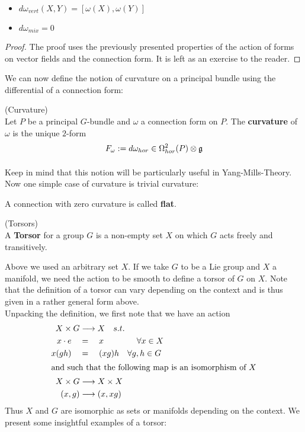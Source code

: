 \begin{prop}~
\begin{itemize}
  \item $d\omega_{vert}(X,Y) = [\omega(X), \omega(Y)]$
  \item $d\omega_{mix} = 0$
\end{itemize}
\begin{proof}
  The proof uses the previously presented properties of the action of forms on vector fields and the connection form. It is left as an exercise to the reader.
\end{proof}
\end{prop}

We can now define the notion of curvature on a principal bundle using the differential of a connection form:

\begin{definition}(Curvature)\\
  Let $P$ be a principal $G$-bundle and $\omega$ a connection form on $P$. The \textbf{curvature} of $\omega$ is the unique $2$-form
  $$ F_\omega := d\omega_{hor} \in \Omega^2_{hor}(P) \mathbin{\mathop{\otimes}\displaylimits_{}} \mathfrak{g} $$
\end{definition}

Keep in mind that this notion will be particularly useful in Yang-Mills-Theory. Now one simple case of curvature is trivial curvature:

\begin{definition}
  A connection with zero curvature is called \textbf{flat}.
\end{definition}


\begin{definition} (Torsors)\\
  A \textbf{Torsor} for a group $G$ is a non-empty set $X$ on which $G$ acts freely and transitively.
\end{definition}

Above we used an arbitrary set $X$. If we take $G$ to be a Lie group and $X$ a manifold, we need the action to be smooth to define a torsor of $G$ on $X$. Note that the definition of a torsor can vary depending on the context and is thus given in a rather general form above.\\

Unpacking the definition, we first note that we have an action
\begin{align}
  X \times G & \longrightarrow X \quad s.t.\\
  x \cdot e \quad &= \quad x \quad \quad \quad \ \ \ \forall x \in X\\
  x(gh) \quad &= \quad (xg)h \quad \forall g,h \in G\\
  \intertext{and such that the following map is an isomorphism of $X$}
  X\times G & \longrightarrow X \times X\\
  (x,g) & \longrightarrow (x, xg)
\end{align}
Thus $X$ and $G$ are isomorphic as sets or manifolds depending on the context. We present some insightful examples of a torsor:

